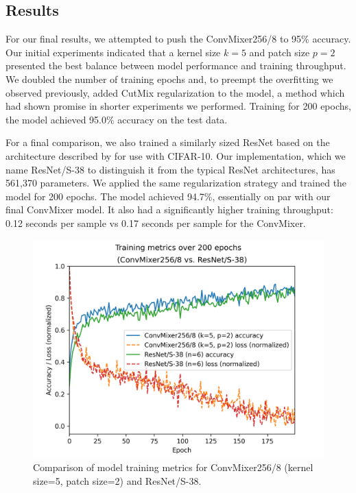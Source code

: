 \documentclass[letterpaper]{article} %
\begin{document}
\subsection{Results}

For our final results, we attempted to push the ConvMixer256/8 to 95\% accuracy. Our initial experiments indicated that a kernel size $k=5$ and patch size $p=2$ presented the best balance between model performance and training throughput. We doubled the number of training epochs and, to preempt the overfitting we observed previously, added CutMix regularization \citep{Yun2019} to the model, a method which had shown promise in shorter experiments we performed. Training for 200 epochs, the model achieved 95.0\% accuracy on the test data.

For a final comparison, we also trained a similarly sized ResNet based on the architecture described by \citet{He2015} for use with CIFAR-10. Our implementation, which we name ResNet/S-38 to distinguish it from the typical ResNet architectures, has 561,370 parameters. We applied the same regularization strategy and trained the model for 200 epochs. The model achieved 94.7\%, essentially on par with our final ConvMixer model. It also had a significantly higher training throughput: 0.12 seconds per sample vs 0.17 seconds per sample for the ConvMixer.

\begin{figure}
    \includegraphics[width=\linewidth]{final_training.png}
    \caption{Comparison of model training metrics for ConvMixer256/8 (kernel size=5, patch size=2) and ResNet/S-38.}
  \end{figure}
\end{document}
